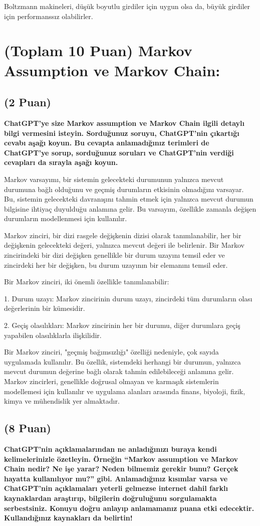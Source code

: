 \documentclass[11pt]{article}
\begin{document}
Boltzmann makineleri, düşük boyutlu girdiler için uygun olsa da, büyük girdiler için performanssız olabilirler.


\section{(Toplam 10 Puan) Markov Assumption ve Markov Chain:}

\subsection{(2 Puan)} \textbf{ChatGPT’ye size Markov assumption ve Markov Chain ilgili detaylı bilgi vermesini isteyin. Sorduğunuz soruyu, ChatGPT'nin çıkartığı cevabı aşağı koyun. Bu cevapta anlamadığınız terimleri de ChatGPT’ye sorup, sorduğunuz soruları ve ChatGPT’nin verdiği cevapları da sırayla aşağı koyun.}

Markov varsayımı, bir sistemin gelecekteki durumunun yalnızca mevcut durumuna bağlı olduğunu ve geçmiş durumların etkisinin olmadığını varsayar. Bu, sistemin gelecekteki davranışını tahmin etmek için yalnızca mevcut durumun bilgisine ihtiyaç duyulduğu anlamına gelir. Bu varsayım, özellikle zamanla değişen durumların modellenmesi için kullanılır.

Markov zinciri, bir dizi rasgele değişkenin dizisi olarak tanımlanabilir, her bir değişkenin gelecekteki değeri, yalnızca mevcut değeri ile belirlenir. Bir Markov zincirindeki bir dizi değişken genellikle bir durum uzayını temsil eder ve zincirdeki her bir değişken, bu durum uzayının bir elemanını temsil eder.

Bir Markov zinciri, iki önemli özellikle tanımlanabilir:

1. Durum uzayı: Markov zincirinin durum uzayı, zincirdeki tüm durumların olası değerlerinin bir kümesidir.

2. Geçiş olasılıkları: Markov zincirinin her bir durumu, diğer durumlara geçiş yapabilen olasılıklarla ilişkilidir.

Bir Markov zinciri, "geçmiş bağımsızlığı" özelliği nedeniyle, çok sayıda uygulamada kullanılır. Bu özellik, sistemdeki herhangi bir durumun, yalnızca mevcut durumun değerine bağlı olarak tahmin edilebileceği anlamına gelir. Markov zincirleri, genellikle doğrusal olmayan ve karmaşık sistemlerin modellemesi için kullanılır ve uygulama alanları arasında finans, biyoloji, fizik, kimya ve mühendislik yer almaktadır.


\subsection{(8 Puan)} \textbf{ChatGPT’nin açıklamalarından ne anladığınızı buraya kendi kelimelerinizle özetleyin. Örneğin ``Markov assumption ve Markov Chain nedir? Ne işe yarar? Neden bilmemiz gerekir bunu? Gerçek hayatta kullanılıyor mu?'' gibi. Anlamadığınız kısımlar varsa ve ChatGPT’nin açıklamaları yeterli gelmezse internet dahil farklı kaynaklardan araştırıp, bilgilerin doğruluğunu sorgulamakta serbestsiniz. Konuyu doğru anlayıp anlamamanız puana etki edecektir. Kullandığınız kaynakları da belirtin!}
\end{document}
